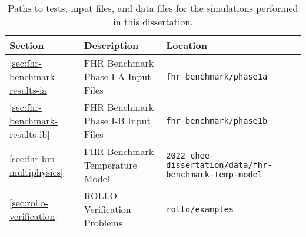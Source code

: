 \begin{landscape}
\begin{table}[htbp!]
    \centering
    \onehalfspacing
    \caption{Paths to tests, input files, and data files for the simulations performed 
    in this dissertation. }
    \label{tab:reproducibility}
    \begin{tabular}{p{2cm}p{8cm}p{12cm}}
    \toprule
    \textbf{Section} & \textbf{Description} & \textbf{Location} \\
    \midrule
    \ref{sec:fhr-benchmark-results-ia} & FHR Benchmark Phase I-A Input Files & 
    \texttt{fhr-benchmark/phase1a} \\ 
    \midrule
    \ref{sec:fhr-benchmark-results-ib} & FHR Benchmark Phase I-B Input Files & 
    \texttt{fhr-benchmark/phase1b} \\ 
    \midrule
    \ref{sec:fhr-bm-multiphysics} & FHR Benchmark Temperature Model & 
    \texttt{2022-chee-dissertation/data/fhr-benchmark-temp-model} \\ 
    \midrule
    \ref{sec:rollo-verification} & ROLLO Verification Problems & 
    \texttt{rollo/examples} \\ 
    \bottomrule
    \end{tabular}
\end{table}
\end{landscape}